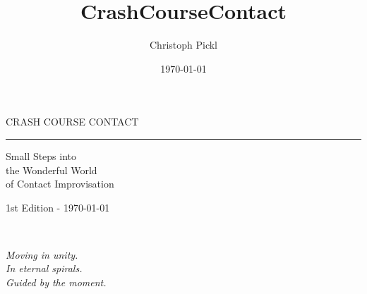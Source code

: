 \documentclass[a5paper,11pt]{book}
\title{CrashCourseContact}
\date{\today}
\author{Christoph Pickl}
\begin{document}
\begin{titlepage}
\begin{center}
	
	\vspace*{\fill}
	
	\fontsize{22}{0}\selectfont
    {\sffamily CRASH COURSE CONTACT}
	\vskip 5mm
	\rule{84mm}{0.4pt}
	\vskip 1mm
	\fontsize{15}{22}\selectfont
	{\sffamily Small Steps into \\ the Wonderful World \\ of Contact Improvisation}
	
	\vskip 70mm
	
	\vspace*{\fill}

	\fontsize{9}{0}\selectfont
	{\sffamily 1st Edition - \today}
\end{center}
\end{titlepage}

\pagestyle{empty}
\tableofcontents
\clearpage
\ifodd\value{page}\else
  \thispagestyle{empty}
\fi

\pagestyle{fancy}

~

\vfill
\begin{center}
	\textit{Moving in unity.}\\
	\textit{In eternal spirals.}\\
	\textit{Guided by the moment.}
\end{center}
\vfill
\newpage
















\printglossaries
\end{document}
